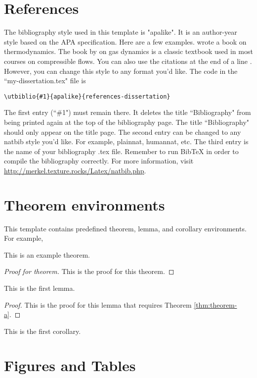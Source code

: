 \section{References}
The bibliography style used in this template is "apalike". It is an author-year style based on the APA specification. Here are a few examples. \cite{Fermi1956} wrote a book on thermodynamics. The book by \cite{liepmann2001} on gas dynamics is a classic textbook used in most courses on compressible flows. You can also use the citations at the end of a line \citep{Saad2010RSPA,Lamb1895}. However, you can change this style to any format you'd like. The code in the ``my-dissertation.tex" file is 
\begin{verbatim}
\utbiblio{#1}{apalike}{references-dissertation}
\end{verbatim} 
The first entry (``\#1") must remain there. It deletes the title ``Bibliography" from being printed again at the top of the bibliography page. The title ``Bibliography" should only appear on the title page. The second entry can be changed to any natbib style you'd like. For example, plainnat, humannat, etc. The third entry is the name of your bibliography .tex file. Remember to run BibTeX in order to compile the bibliography correctly. For more information, visit \href{http://merkel.texture.rocks/Latex/natbib.php}{http://merkel.texture.rocks/Latex/natbib.php}.

\section{Theorem environments}
This template contains predefined theorem, lemma, and corollary environments. For example,
\begin{theorem}\label{thm:theorem-a}
    This is an example theorem.
\end{theorem}
\begin{proof}[Proof for theorem]
    This is the proof for this theorem.
\end{proof}
\begin{lemma}
    This is the first lemma.
\end{lemma}
\begin{proof}
	This is the proof for this lemma that requires Theorem \ref{thm:theorem-a}.
\end{proof}
\begin{corollary}
    This is the first corollary.
\end{corollary}

\section{Figures and Tables}
